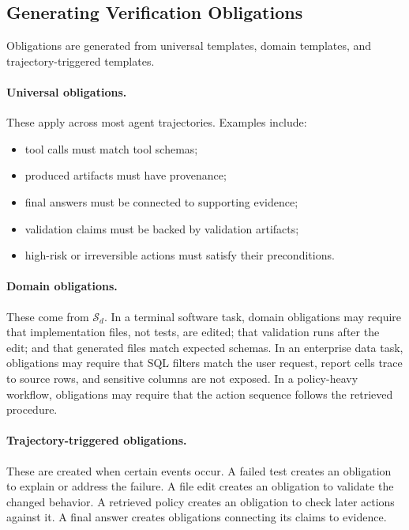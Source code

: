 \documentclass{article} %
\begin{document}
\subsection{Generating Verification Obligations}

Obligations are generated from universal templates, domain templates, and trajectory-triggered templates.

\paragraph{Universal obligations.}
These apply across most agent trajectories. Examples include:
\begin{itemize}[leftmargin=1.2em]
\item tool calls must match tool schemas;
\item produced artifacts must have provenance;
\item final answers must be connected to supporting evidence;
\item validation claims must be backed by validation artifacts;
\item high-risk or irreversible actions must satisfy their preconditions.
\end{itemize}

\paragraph{Domain obligations.}
These come from $\mathcal{S}_d$. In a terminal software task, domain obligations may require that implementation files, not tests, are edited; that validation runs after the edit; and that generated files match expected schemas. In an enterprise data task, obligations may require that SQL filters match the user request, report cells trace to source rows, and sensitive columns are not exposed. In a policy-heavy workflow, obligations may require that the action sequence follows the retrieved procedure.

\paragraph{Trajectory-triggered obligations.}
These are created when certain events occur. A failed test creates an obligation to explain or address the failure. A file edit creates an obligation to validate the changed behavior. A retrieved policy creates an obligation to check later actions against it. A final answer creates obligations connecting its claims to evidence.
\end{document}
